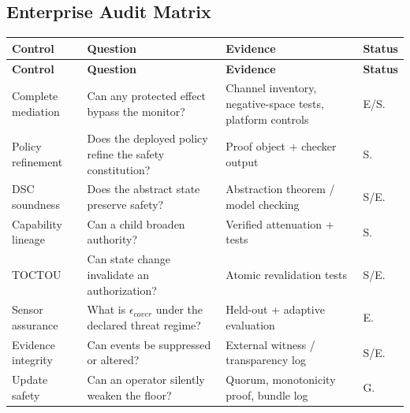 \documentclass[11pt]{article}
\def\ensuremath#1{#1}%
\def\mathrm#1{#1}%
\newcommand{\epscover}{\ensuremath{\epsilon_{\mathrm{cover}}}}
\begin{document}
\subsection{Enterprise Audit Matrix}
\begin{longtable}{@{}L{3.2cm} L{4.0cm} L{4.0cm} L{2.8cm}@{}}
\toprule
\textbf{Control} & \textbf{Question} & \textbf{Evidence} & \textbf{Status}\\
\midrule
\endfirsthead
\toprule
\textbf{Control} & \textbf{Question} & \textbf{Evidence} & \textbf{Status}\\
\midrule
\endhead
\bottomrule
\endfoot
Complete mediation & Can any protected effect bypass the monitor? & Channel inventory, negative-space tests, platform controls & E/S. \\
Policy refinement & Does the deployed policy refine the safety constitution? & Proof object + checker output & S. \\
DSC soundness & Does the abstract state preserve safety? & Abstraction theorem / model checking & S/E. \\
Capability lineage & Can a child broaden authority? & Verified attenuation + tests & S. \\
TOCTOU & Can state change invalidate an authorization? & Atomic revalidation tests & S/E. \\
Sensor assurance & What is \(\epscover\) under the declared threat regime? & Held-out + adaptive evaluation & E. \\
Evidence integrity & Can events be suppressed or altered? & External witness / transparency log & S/E. \\
Update safety & Can an operator silently weaken the floor? & Quorum, monotonicity proof, bundle log & G. \\
\end{longtable}

\newpage
\end{document}
